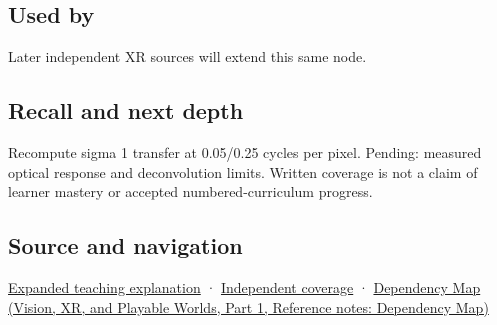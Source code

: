 \subsection{Used by}\label{appendix-8b76b0efd27f-used-by}

\hypertarget{appendix-8b76b0efd27f-used-by}{}

Later independent XR sources will extend this same node.

\subsection{Recall and next depth}\label{appendix-8b76b0efd27f-recall-and-next-depth}

\hypertarget{appendix-8b76b0efd27f-recall-and-next-depth}{}

Recompute sigma 1 transfer at 0.05/0.25 cycles per pixel. Pending: measured optical response and deconvolution limits. Written coverage is not a claim of learner mastery or accepted numbered-curriculum progress.

\subsection{Source and navigation}\label{appendix-8b76b0efd27f-source-and-navigation}

\hypertarget{appendix-8b76b0efd27f-source-and-navigation}{}

\hyperref[04-visual-computing-ii-ch042-a-footprint-is-more-meaningful-than-an-isolated-pixel-center]{Expanded teaching explanation} · \hyperref[appendix-fd090d982a15-xr01---independent-seeing-and-representation-source]{Independent coverage} · \href{../07-Vision-XR-and-Playable-Worlds-P01/main.pdf\#appendix-4ad47bdd269a}{Dependency Map (Vision, XR, and Playable Worlds, Part 1, Reference notes: Dependency Map)}
